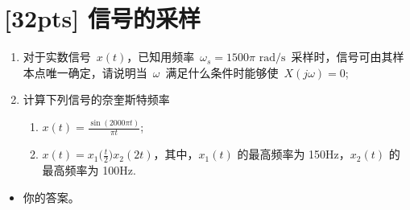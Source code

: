 \documentclass[tikz,a4paper,UTF8]{article}
\numberwithin{equation}{section}
\begin{document}
\newpage
\section{[32pts] 信号的采样}
\begin{enumerate}
	\item 对于实数信号~$x(t)$，已知用频率~$\omega_s=1500 \pi \text{ rad/s}$~采样时，信号可由其样本点唯一确定，请说明当~$\omega$~满足什么条件时能够使~$X(j\omega)=0$;
	\item 计算下列信号的奈奎斯特频率
	\begin{enumerate}
		\item $x(t)=\frac{\sin(2000\pi t)}{\pi t}$;
		\item $x(t)=x_1 \bigl(\frac{t}{2}\bigr) x_2 (2t)$，其中，$x_1 (t)$ 的最高频率为 150Hz，$x_2 (t)$ 的最高频率为 100Hz.
	\end{enumerate}
\end{enumerate}

\begin{framed}
    \begin{spacing}{1.5}
        \begin{itemize}
            \item 你的答案。
        \end{itemize}
    \end{spacing}
\end{framed}
\end{document}
